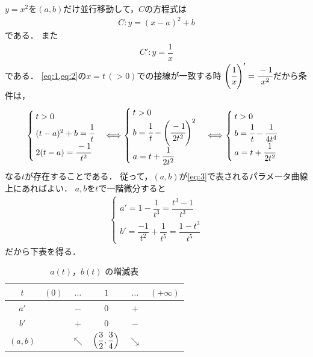 \documentclass[../../main.tex]{subfiles}
\begin{document}
$y=x^2$を$(a,b)$だけ並行移動して，$C$の方程式は
\begin{align}
  C:y=(x-a)^2+b \label{eq:1}
\end{align}
である．
また
\begin{align}
  C': y = \dfrac{1}{x} \label{eq:2}
\end{align}
である．
\cref{eq:1,eq:2}の$x=t\,(>0)$での接線が一致する時
$\left(\cfrac{1}{x}\right)'=\cfrac{-1}{x^2}$だから条件は，
\begin{align}
  \begin{cases}
    t>0 \\
    (t-a)^2+b=\cfrac{1}{t} \\
    2(t-a)=\cfrac{-1}{t^2}
  \end{cases}
  \Longleftrightarrow
  \begin{cases}
    t>0 \\
    b=\cfrac{1}{t}-\left(\cfrac{-1}{2t^2}\right)^2 \\
    a=t+\cfrac{1}{2t^2}
  \end{cases}
  \Longleftrightarrow
  \begin{cases}
    t>0 \\
    b=\cfrac{1}{t}-\cfrac{1}{4t^4} \\
    a=t+\cfrac{1}{2t^2} \label{eq:3}
  \end{cases}
\end{align}
なる$t$が存在することである．
従って，$(a,b)$が\cref{eq:3}で表されるパラメータ曲線上にあればよい．
$a,b$を$t$で一階微分すると
\begin{align}
  \begin{cases}
    a'=1-\dfrac{1}{t^3}=\dfrac{t^3-1}{t^3} \\
    b'=\dfrac{-1}{t^2}+\dfrac{1}{t^5}=\dfrac{1-t^3}{t^5}
  \end{cases}
\end{align}
だから下表を得る．

\begin{table}[htb]
  \centering
  \caption{$a(t)$，$b(t)$ の増減表}
  \label{tab:utokyo1987q2_increase_decrease}
  \renewcommand{\arraystretch}{1.4}
  \begin{tabular}{c|c|c|c|c|c}
    $t$ & $(0)$ & $\dots$ & $1$ & $\dots$ & $(+\infty)$ \\ \hline
    $a'$ & & $-$ & $0$ & $+$ & \\ \hline
    $b'$ & & $+$ & $0$ & $-$ & \\ \hline
    $(a,b)$ & & $\nwarrow$ & $\Bigl(\dfrac{3}{2},\dfrac{3}{4}\Bigr)$ & $\searrow$ &
  \end{tabular}
\end{table}
\end{document}
